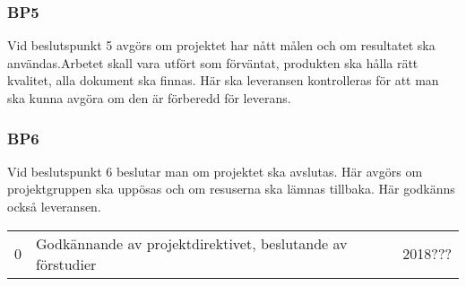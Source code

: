 \documentclass[projektplan/plan.tex]{subfiles}
\begin{document}
\subsubsection*{BP5}
Vid beslutspunkt 5 avgörs om projektet har nått målen och om resultatet ska
användas.Arbetet skall vara utfört som förväntat, produkten ska hålla rätt
kvalitet, alla dokument ska finnas. Här ska leveransen kontrolleras för att man
ska kunna avgöra om den är förberedd för leverans.

\subsubsection*{BP6}
Vid beslutspunkt 6 beslutar man om projektet ska avslutas. Här avgörs om
projektgruppen ska uppösas och om resuserna ska lämnas tillbaka. Här godkänns
också leveransen.

\begin{center}
    \begin{tabular}{| l | l | l |}
    0 & Godkännande av projektdirektivet, beslutande av förstudier & 2018??? 
    \end{tabular}
\end{center}    

\newpage
\end{document}
